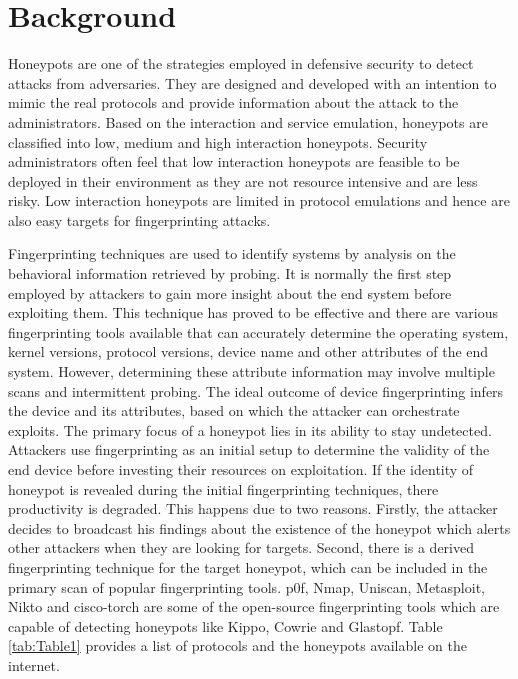 \documentclass[letterpaper, 10 pt, conference]{ieeeconf}  %
\begin{document}
\section{Background}
Honeypots are one of the strategies employed in defensive security to detect attacks from adversaries. They are designed and developed with an intention to mimic the real protocols and provide information about the attack to the administrators. Based on the interaction and service emulation, honeypots are classified into low, medium and high interaction honeypots. Security administrators often feel that low interaction honeypots are feasible to be deployed in their environment as they are not resource intensive and are less risky. Low interaction honeypots are limited in protocol emulations and hence are also easy targets for fingerprinting attacks. 

Fingerprinting techniques are used to identify systems by analysis on the behavioral information retrieved by probing.   
It is normally the first step employed by attackers to gain more insight about the end system before exploiting them. This technique has proved to be effective and there are various fingerprinting tools available that can accurately determine the operating system, kernel versions, protocol versions, device name and other attributes of the end system. However, determining these attribute information may involve multiple scans and intermittent probing. The ideal outcome of device fingerprinting infers the device and its attributes, based on which the attacker can orchestrate exploits. The primary focus of a honeypot lies in its ability to stay undetected. Attackers use fingerprinting as an initial setup to determine the validity of the end device before investing their resources on exploitation. If the identity of honeypot is revealed during the initial fingerprinting techniques, there productivity is degraded. This happens due to two reasons. Firstly, the attacker decides to broadcast his findings about the existence of the honeypot which alerts other attackers when they are looking for targets. Second, there is a derived fingerprinting technique for the target honeypot, which can be included in the primary scan of popular fingerprinting tools. p0f, Nmap, Uniscan, Metasploit, Nikto and cisco-torch are some of the open-source fingerprinting tools which are capable of detecting honeypots like Kippo, Cowrie and Glastopf. Table \ref{tab:Table1} provides a list of protocols and the honeypots available on the internet.   
\end{document}
